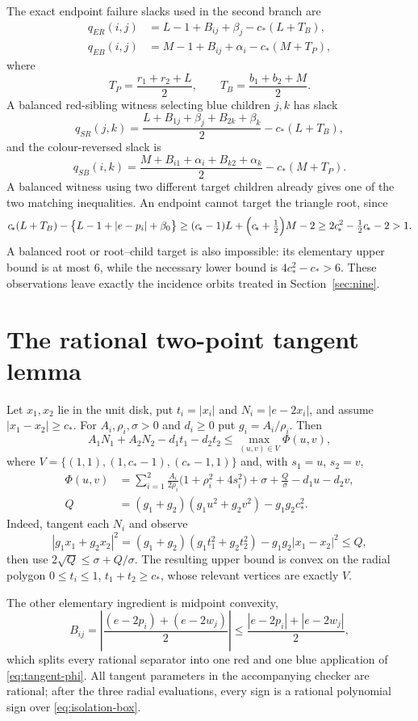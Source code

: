 \documentclass[11pt]{article}
\theoremstyle{plain}
\theoremstyle{definition}
\theoremstyle{remark}
\newcommand{\cstar}{c_{\!*}}
\begin{document}
The exact endpoint failure slacks used in the second branch are
\begin{align*}
 q_{ER}(i,j)&=L-1+B_{ij}+\beta_j-\cstar(L+T_B),\\
 q_{EB}(i,j)&=M-1+B_{ij}+\alpha_i-\cstar(M+T_P),
\end{align*}
where
\[
 T_P=\frac{r_1+r_2+L}{2},\qquad T_B=\frac{b_1+b_2+M}{2}.
\]
A balanced red-sibling witness selecting blue children $j,k$ has slack
\[
 q_{SR}(j,k)=\frac{L+B_{1j}+\beta_j+B_{2k}+\beta_k}{2}-\cstar(L+T_B),
\]
and the colour-reversed slack is
\[
 q_{SB}(i,k)=\frac{M+B_{i1}+\alpha_i+B_{k2}+\alpha_k}{2}-\cstar(M+T_P).
\]
A balanced witness using two different target children already gives one of
the two matching inequalities.  An endpoint cannot target the triangle
root, since
\[
 \cstar(L+T_B)-\bigl\{L-1+|e-p_i|+\beta_0\bigr\}
 \ge(\cstar-1)L+\Bigl(\cstar+\tfrac12\Bigr)M-2
 \ge2\cstar^2-\tfrac12\cstar-2>1 .
\]
A balanced root or root--child target is also impossible: its elementary
upper bound is at most $6$, while the necessary lower bound is
$4\cstar^2-\cstar>6$.  These observations leave exactly the incidence
orbits treated in Section~\ref{sec:nine}.

\section{The rational two-point tangent lemma}\label{app:tangent}

Let $x_1,x_2$ lie in the unit disk, put $t_i=|x_i|$ and $N_i=|e-2x_i|$, and
assume $|x_1-x_2|\ge\cstar$.  For $A_i,\rho_i,\sigma>0$ and $d_i\ge0$ put
$g_i=A_i/\rho_i$.  Then
\begin{equation}\label{eq:tangent-phi}
 A_1N_1+A_2N_2-d_1t_1-d_2t_2\le\max_{(u,v)\in V}\Phi(u,v),
\end{equation}
where $V=\{(1,1),(1,\cstar-1),(\cstar-1,1)\}$ and, with $s_1=u$, $s_2=v$,
\begin{align*}
 \Phi(u,v)&=\sum_{i=1}^2\frac{A_i}{2\rho_i}\bigl(1+\rho_i^2+4s_i^2\bigr)
   +\sigma+\frac{Q}{\sigma}-d_1u-d_2v,\\
 Q&=(g_1+g_2)(g_1u^2+g_2v^2)-g_1g_2\cstar^2 .
\end{align*}
Indeed, tangent each $N_i$ and observe
\[
 |g_1x_1+g_2x_2|^2=(g_1+g_2)(g_1t_1^2+g_2t_2^2)-g_1g_2|x_1-x_2|^2\le Q,
\]
then use $2\sqrt Q\le\sigma+Q/\sigma$.  The resulting upper bound is convex
on the radial polygon $0\le t_i\le1$, $t_1+t_2\ge\cstar$, whose relevant
vertices are exactly $V$.

The other elementary ingredient is midpoint convexity,
\begin{equation}\label{eq:B-midpoint}
 B_{ij}=\left|\frac{(e-2p_i)+(e-2w_j)}{2}\right|
 \le\frac{|e-2p_i|+|e-2w_j|}{2},
\end{equation}
which splits every rational separator into one red and one blue application
of \eqref{eq:tangent-phi}.  All tangent parameters in the accompanying
checker are rational; after the three radial evaluations, every sign is a
rational polynomial sign over \eqref{eq:isolation-box}.
\end{document}
